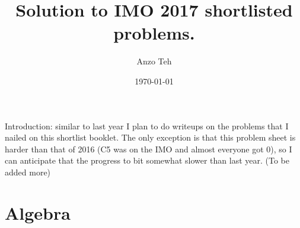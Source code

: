 \documentclass[11pt,a4paper]{article}
\begin{document}
\newcommand{\la}{\leftarrow}
\newcommand{\lra}{\leftrightarrow}


\title{Solution to IMO 2017 shortlisted problems.}
\author{Anzo Teh}
\date{\today}
\maketitle

Introduction: similar to last year I plan to do writeups on the problems that I nailed on this shortlist booklet. The only exception is that this problem sheet is harder than that of 2016 (C5 was on the IMO and almost everyone got 0), so I can anticipate that the progress to bit somewhat slower than last year. (To be added more)

\newpage
\section{Algebra}
\end{document}
